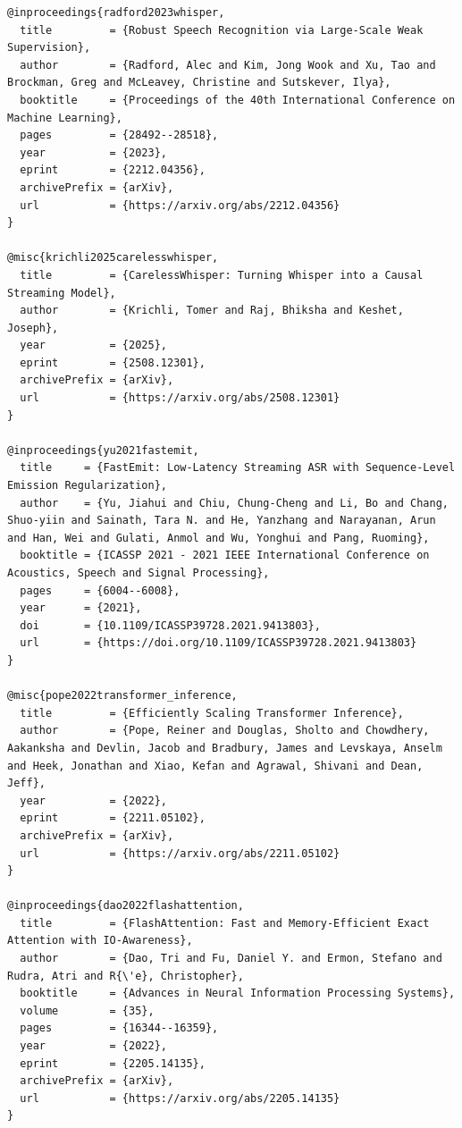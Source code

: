\documentclass[UTF8,a4paper,12pt]{ctexart}
\begin{document}
\begin{Verbatim}[breaklines=true,breakanywhere=true]
@inproceedings{radford2023whisper,
  title         = {Robust Speech Recognition via Large-Scale Weak Supervision},
  author        = {Radford, Alec and Kim, Jong Wook and Xu, Tao and Brockman, Greg and McLeavey, Christine and Sutskever, Ilya},
  booktitle     = {Proceedings of the 40th International Conference on Machine Learning},
  pages         = {28492--28518},
  year          = {2023},
  eprint        = {2212.04356},
  archivePrefix = {arXiv},
  url           = {https://arxiv.org/abs/2212.04356}
}

@misc{krichli2025carelesswhisper,
  title         = {CarelessWhisper: Turning Whisper into a Causal Streaming Model},
  author        = {Krichli, Tomer and Raj, Bhiksha and Keshet, Joseph},
  year          = {2025},
  eprint        = {2508.12301},
  archivePrefix = {arXiv},
  url           = {https://arxiv.org/abs/2508.12301}
}

@inproceedings{yu2021fastemit,
  title     = {FastEmit: Low-Latency Streaming ASR with Sequence-Level Emission Regularization},
  author    = {Yu, Jiahui and Chiu, Chung-Cheng and Li, Bo and Chang, Shuo-yiin and Sainath, Tara N. and He, Yanzhang and Narayanan, Arun and Han, Wei and Gulati, Anmol and Wu, Yonghui and Pang, Ruoming},
  booktitle = {ICASSP 2021 - 2021 IEEE International Conference on Acoustics, Speech and Signal Processing},
  pages     = {6004--6008},
  year      = {2021},
  doi       = {10.1109/ICASSP39728.2021.9413803},
  url       = {https://doi.org/10.1109/ICASSP39728.2021.9413803}
}

@misc{pope2022transformer_inference,
  title         = {Efficiently Scaling Transformer Inference},
  author        = {Pope, Reiner and Douglas, Sholto and Chowdhery, Aakanksha and Devlin, Jacob and Bradbury, James and Levskaya, Anselm and Heek, Jonathan and Xiao, Kefan and Agrawal, Shivani and Dean, Jeff},
  year          = {2022},
  eprint        = {2211.05102},
  archivePrefix = {arXiv},
  url           = {https://arxiv.org/abs/2211.05102}
}

@inproceedings{dao2022flashattention,
  title         = {FlashAttention: Fast and Memory-Efficient Exact Attention with IO-Awareness},
  author        = {Dao, Tri and Fu, Daniel Y. and Ermon, Stefano and Rudra, Atri and R{\'e}, Christopher},
  booktitle     = {Advances in Neural Information Processing Systems},
  volume        = {35},
  pages         = {16344--16359},
  year          = {2022},
  eprint        = {2205.14135},
  archivePrefix = {arXiv},
  url           = {https://arxiv.org/abs/2205.14135}
}


\end{Verbatim}
\end{document}
